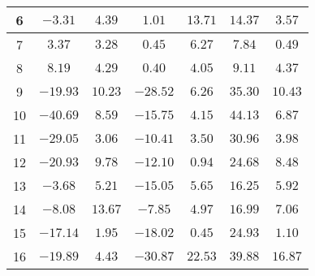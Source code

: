 \begin{table}[H]
\begin{tabular}{|c|c|c|c|c|c|c|}
                        6   &   $-3.31$   &  $4.39$   &   $1.01$    &  $13.71$  & $14.37$   &  $3.57$   \\ \hline
                        7   &   $3.37$    &  $3.28$   &   $0.45$    &  $6.27$   & $7.84$    &  $0.49$   \\ \hline
                        8   &   $8.19$    &  $4.29$   &   $0.40$    &  $4.05$   & $9.11$    &  $4.37$   \\ \hline
                        9   &   $-19.93$  &  $10.23$  &   $-28.52$  &  $6.26$   & $35.30$   &  $10.43$  \\ \hline
                        10  &   $-40.69$  &  $8.59$   &   $-15.75$  &  $4.15$   & $44.13$   &  $6.87$   \\ \hline
                        11  &   $-29.05$  &  $3.06$   &   $-10.41$  &  $3.50$   & $30.96$   &  $3.98$   \\ \hline
                        12  &   $-20.93$  &  $9.78$   &   $-12.10$  &  $0.94$   & $24.68$   &  $8.48$   \\ \hline
                        13  &   $-3.68$   &  $5.21$   &   $-15.05$  &  $5.65$   & $16.25$   &  $5.92$   \\ \hline
                        14  &   $-8.08$   &  $13.67$  &   $-7.85$   &  $4.97$   & $16.99$   &  $7.06$   \\ \hline
                        15  &   $-17.14$  &  $1.95$   &   $-18.02$  &  $0.45$   & $24.93$   &  $1.10$   \\ \hline
                        16  &   $-19.89$  &  $4.43$   &   $-30.87$  &  $22.53$  & $39.88$   &  $16.87$  \\ \hline
                    \end{tabular}
    \label{tab:media_fisica_6_total}
\end{table}

\newpage
